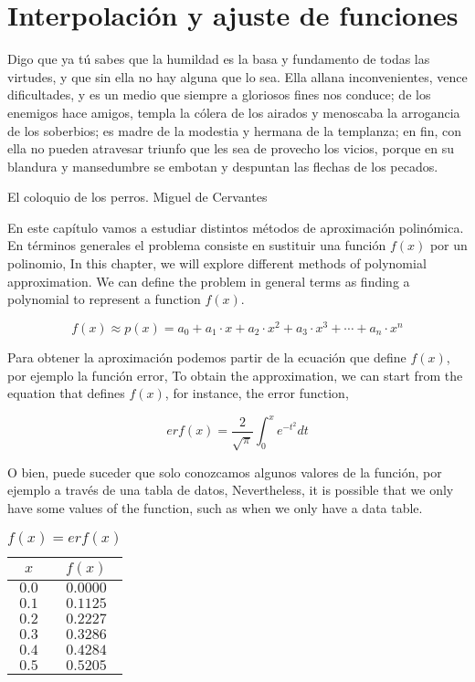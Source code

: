 \chapter{Interpolación y ajuste de funciones}\label{interpolacion}
\epigraph{Digo que ya tú sabes que la humildad es la basa y fundamento de todas las virtudes, y que sin ella no hay alguna que lo sea. Ella allana inconvenientes, vence dificultades, y es un medio que siempre a gloriosos fines nos conduce; de los enemigos hace amigos, templa la cólera de los airados y menoscaba la arrogancia de los soberbios; es madre de la modestia y hermana de la templanza; en fin, con ella no pueden atravesar triunfo que les sea de provecho los vicios, porque en su blandura y mansedumbre se embotan y despuntan las flechas de los pecados.}{El coloquio de los perros. Miguel de Cervantes}


\begin{paracol}{2}
En este capítulo vamos a estudiar distintos métodos de aproximación polinómica. En términos generales el problema consiste en sustituir una función $f(x)$ por un polinomio,
\switchcolumn
In this chapter, we will explore different methods of polynomial approximation. We can define the problem in general terms as finding a polynomial to represent a function $f(x)$. 
\end{paracol}
\begin{equation*}
f(x)\approx p(x)=a_0+a_1\cdot x+a_2\cdot x^2+a_3\cdot x^3+\cdots +a_n \cdot x^n
\end{equation*}
\begin{paracol}{2}
Para obtener la aproximación podemos partir de la ecuación que define $f(x)$,  por ejemplo la función error,
\switchcolumn
To obtain the approximation, we can start from the equation that defines $f(x)$, for instance, the error function,
\end{paracol}
\begin{equation*}
erf(x)=\frac{2}{\sqrt{\pi}}\int_0^x e^{-t^2}dt
\end{equation*}
\begin{paracol}{2}
O bien, puede suceder que solo conozcamos algunos valores de la función, por ejemplo a través de una tabla de datos,
\switchcolumn
Nevertheless, it is possible that we only have some values of the function, such as when we only have a data table. 
\end{paracol}
\begin{table}[h]
\caption{$f(x)=erf(x)$}
\centering
\begin{tabular}{c|c}
$x$&$f(x)$\\ 
\hline
$0.0$& $0.0000$\\
$0.1$&$0.1125$\\
$0.2$&$0.2227$\\
$0.3$&$0.3286$\\
$0.4$&$0.4284$\\
$0.5$&$0.5205$\\
\end{tabular}
\label{tpuntos2}
\end{table}

